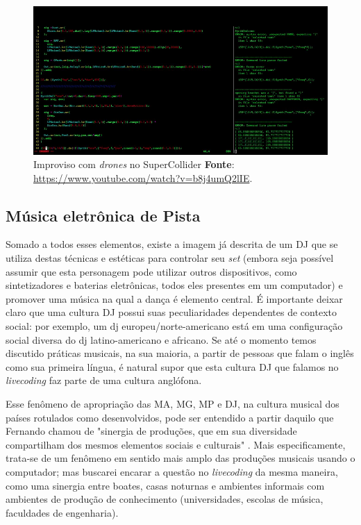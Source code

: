 \begin{figure}
\begin{center}
\includegraphics[scale=0.5]{./imagens/sc_drone.png}
\caption{Improviso com \emph{drones} no SuperCollider \textbf{Fonte}: \url{https://www.youtube.com/watch?v=b8j4umQ2lIE}. }
\label{sc_drone}
\end{center}
\end{figure}

\subsection{Música eletrônica de Pista}\label{sec:musica_vanguarda_pista}

Somado a todos esses elementos, existe a imagem já descrita de um DJ que se utiliza destas técnicas e estéticas para controlar seu \emph{set} (embora seja possível assumir que esta personagem pode utilizar outros dispositivos, como sintetizadores e baterias eletrônicas, todos eles presentes em um computador) e promover uma música na qual a dança é elemento central. É importante deixar claro que uma cultura DJ possui suas peculiaridades dependentes de contexto social: por exemplo, um dj europeu/norte-americano está em uma configuração social diversa do dj latino-americano e africano. Se até o momento temos discutido práticas musicais, na sua maioria, a partir de pessoas que falam o inglês como sua primeira língua, é natural supor que esta cultura DJ que falamos no \emph{livecoding} faz parte de uma cultura anglófona.

Esse fenômeno de apropriação das MA, MG, MP e DJ, na cultura musical dos países rotulados como desenvolvidos, pode ser entendido a partir daquilo que Fernando   chamou de "sinergia de produções, que em sua diversidade compartilham dos mesmos elementos sociais e culturais" \cite[p.~152]{iazzetta_musica_2009}. Mais especificamente, trata-se de um fenômeno em sentido mais amplo das produções musicais usando o computador; mas buscarei encarar a questão no \emph{livecoding} da mesma maneira, como uma sinergia entre boates, casas noturnas e ambientes informais com ambientes de produção de conhecimento (universidades, escolas de música, faculdades de engenharia).

